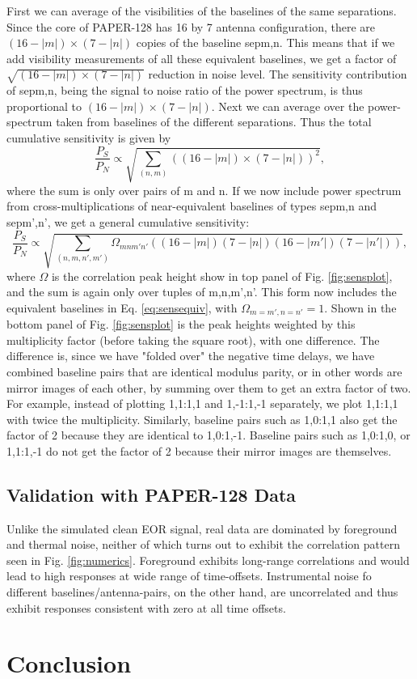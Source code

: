 \documentclass[preprint2,numberedappendix,tighten,twocolappendix]{aastex6}  %
\renewcommand\[{\begin{equation}}
\renewcommand\]{\end{equation}}
\begin{document}
First we can average of the visibilities of the baselines of the same
separations. Since the core of PAPER-128 has 16 by 7 antenna configuration, there
are $(16-|m|)\times(7-|n|)$ copies of the baseline sepm,n. This means
that if we add visibility measurements of all these equivalent baselines,
we get a factor of $\sqrt{(16-|m|)\times(7-|n|)}$ reduction in noise
level. The sensitivity contribution of sepm,n, being the signal to
noise ratio of the power spectrum, is thus proportional to $(16-|m|)\times(7-|n|)$.
Next we can average over the power-spectrum taken from baselines of
the different separations. Thus the total cumulative sensitivity is
given by 
\begin{equation}
\frac{P_{S}}{P_{N}}\propto\sqrt{\sum_{(n,m)}\left((16-|m|)\times(7-|n|)\right)^{2}},\label{eq:sensequiv}
\end{equation}
where the sum is only over pairs of m and n. If we now include power
spectrum from cross-multiplications of near-equivalent baselines of
types sepm,n and sepm',n', we get a general cumulative sensitivity:
\small
\begin{equation}
\frac{P_{S}}{P_{N}}\propto\sqrt{\sum_{(n,m,n',m')}\Omega_{mnm'n'}\left((16-|m|)(7-|n|)(16-|m'|)(7-|n'|)\right)},\label{eq:sensul}
\end{equation}
\normalsize
where $\Omega$ is the correlation peak height show in top panel of Fig. \eqref{fig:sensplot},
and the sum is again only over tuples of m,n,m',n'. This form now
includes the equivalent baselines in Eq. \eqref{eq:sensequiv}, with
$\Omega_{m=m',n=n'}=1$. 
Shown in the bottom panel of Fig. \eqref{fig:sensplot} is the peak heights weighted
by this multiplicity factor (before taking the square root), with one difference. The difference is, 
since we have "folded over" the negative time delays, we have combined baseline pairs that are identical modulus parity, 
or in other words are mirror images of each other, by summing over them to get an extra factor of two. For example, 
instead of plotting 1,1:1,1 and 1,-1:1,-1 separately, we plot 1,1:1,1 with twice the multiplicity. Similarly, baseline pairs such as 
1,0:1,1 also get the factor of 2 because they are identical to 1,0:1,-1. Baseline pairs such as 1,0:1,0, or 1,1:1,-1 do not get
the factor of 2 because their mirror images are themselves. 

\subsection{Validation with PAPER-128 Data}
Unlike the simulated clean EOR signal, real data are dominated by foreground and thermal noise, neither of which turns out to exhibit the correlation pattern seen in Fig.  \ref{fig:numerics}. Foreground exhibits long-range correlations and would lead to high responses at wide range of time-offsets. Instrumental noise fo different baselines/antenna-pairs, on the other hand, are uncorrelated and thus exhibit responses consistent with zero at all time offsets. 

\section{Conclusion}



\end{document}
